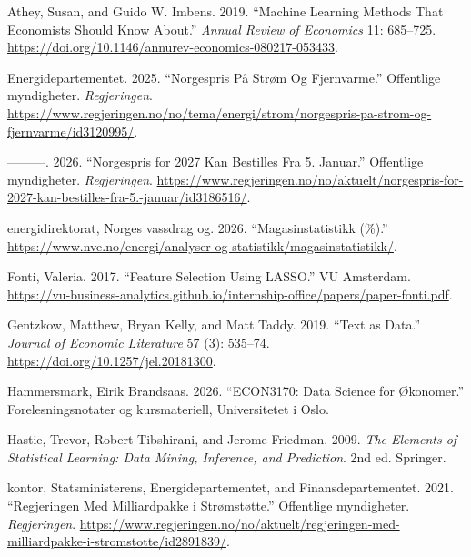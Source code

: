 \documentclass[
  letterpaper,
  DIV=11,
  numbers=noendperiod]{scrartcl}
\newlength{\cslhangindent}
\newenvironment{CSLReferences}[2] %
 {\begin{list}{}{%
  \setlength{\itemindent}{0pt}
  \setlength{\leftmargin}{0pt}
  \setlength{\parsep}{0pt}
  \ifodd #1
   \setlength{\leftmargin}{\cslhangindent}
   \setlength{\itemindent}{-1\cslhangindent}
  \fi
  \setlength{\itemsep}{#2\baselineskip}}}
 {\end{list}}
\begin{document}
\label{refs}
\begin{CSLReferences}{1}{0}
Athey, Susan, and Guido W. Imbens. 2019. {``Machine Learning Methods
That Economists Should Know About.''} \emph{Annual Review of Economics}
11: 685--725.
\url{https://doi.org/10.1146/annurev-economics-080217-053433}.

Energidepartementet. 2025. {``Norgespris På Strøm Og Fjernvarme.''}
Offentlige myndigheter. \emph{Regjeringen}.
\url{https://www.regjeringen.no/no/tema/energi/strom/norgespris-pa-strom-og-fjernvarme/id3120995/}.

---------. 2026. {``Norgespris for 2027 Kan Bestilles Fra 5. Januar.''}
Offentlige myndigheter. \emph{Regjeringen}.
\url{https://www.regjeringen.no/no/aktuelt/norgespris-for-2027-kan-bestilles-fra-5.-januar/id3186516/}.

energidirektorat, Norges vassdrag og. 2026. {``Magasinstatistikk
(\%).''}
\url{https://www.nve.no/energi/analyser-og-statistikk/magasinstatistikk/}.

Fonti, Valeria. 2017. {``Feature Selection Using LASSO.''} VU Amsterdam.
\url{https://vu-business-analytics.github.io/internship-office/papers/paper-fonti.pdf}.

Gentzkow, Matthew, Bryan Kelly, and Matt Taddy. 2019. {``Text as
Data.''} \emph{Journal of Economic Literature} 57 (3): 535--74.
\url{https://doi.org/10.1257/jel.20181300}.

Hammersmark, Eirik Brandsaas. 2026. {``ECON3170: Data Science for
Økonomer.''} Forelesningsnotater og kursmateriell, Universitetet i Oslo.

Hastie, Trevor, Robert Tibshirani, and Jerome Friedman. 2009. \emph{The
Elements of Statistical Learning: Data Mining, Inference, and
Prediction}. 2nd ed. Springer.

kontor, Statsministerens, Energidepartementet, and Finansdepartementet.
2021. {``Regjeringen Med Milliardpakke i Strømstøtte.''} Offentlige
myndigheter. \emph{Regjeringen}.
\url{https://www.regjeringen.no/no/aktuelt/regjeringen-med-milliardpakke-i-stromstotte/id2891839/}.


\end{CSLReferences}
\end{document}
